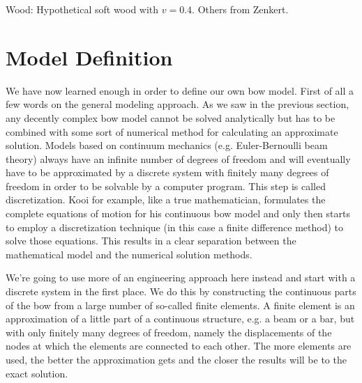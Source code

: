 Wood: Hypothetical soft wood with $v = 0.4$. Others from Zenkert.

%
%	
%	
%	
%	
%	
%	
%	
%	

\section{Model Definition}

We have now learned enough in order to define our own bow model. First of all a few words on the general modeling approach. As we saw in the previous section, any decently complex bow model cannot be solved analytically but has to be combined with some sort of numerical method for calculating an approximate solution. Models based on continuum mechanics (e.g. Euler-Bernoulli beam theory) always have an infinite number of degrees of freedom and will eventually have to be approximated by a discrete system with finitely many degrees of freedom in order to be solvable by a computer program. This step is called discretization. Kooi for example, like a true mathematician, formulates the complete equations of motion for his continuous bow model and only then starts to employ a discretization technique (in this case a finite difference method) to solve those equations. This results in a clear separation between the mathematical model and the numerical solution methods.

We're going to use more of an engineering approach here instead and start with a discrete system in the first place. We do this by constructing the continuous parts of the bow from a large number of so-called finite elements. A finite element is an approximation of a little part of a continuous structure, e.g. a beam or a bar, but with only finitely many degrees of freedom, namely the displacements of the nodes at which the elements are connected to each other. The more elements are used, the better the approximation gets and the closer the results will be to the exact solution.

